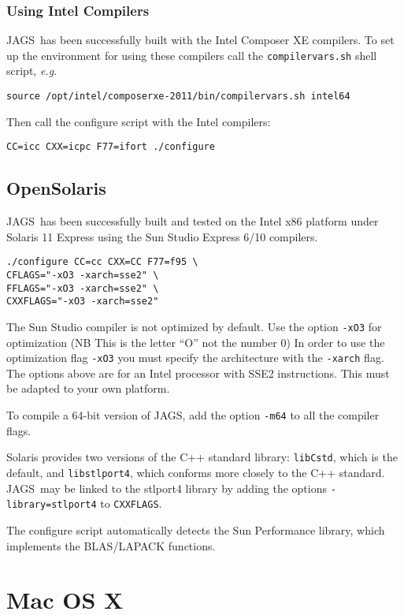 \documentclass[11pt, a4paper, titlepage]{article}
\newcommand{\JAGS}{\textsf{JAGS}}
\begin{document}
\subsubsection{Using Intel Compilers}

\JAGS\ has been successfully built with the Intel Composer XE
compilers. To set up the environment for using these compilers call
the \verb+compilervars.sh+ shell script, {\em e.g.}
\begin{verbatim}
source /opt/intel/composerxe-2011/bin/compilervars.sh intel64
\end{verbatim}
Then call the configure script with the Intel compilers:
\begin{verbatim}
CC=icc CXX=icpc F77=ifort ./configure 
\end{verbatim}

\subsection{OpenSolaris}

\JAGS\ has been successfully built and tested on the Intel x86
platform under Solaris 11 Express using the Sun Studio Express 6/10
compilers.
\begin{verbatim}
./configure CC=cc CXX=CC F77=f95 \
CFLAGS="-xO3 -xarch=sse2" \
FFLAGS="-xO3 -xarch=sse2" \
CXXFLAGS="-xO3 -xarch=sse2"
\end{verbatim}
The Sun Studio compiler is not optimized by default. Use the option
\verb+-xO3+ for optimization (NB This is the letter ``O'' not the
number 0) In order to use the optimization flag \verb+-xO3+ you
must specify the architecture with the \verb+-xarch+ flag. The options
above are for an Intel processor with SSE2 instructions. This must be
adapted to your own platform.

To compile a 64-bit version of JAGS, add the option \verb+-m64+ to
all the compiler flags.

Solaris provides two versions of the C++ standard library:
\texttt{libCstd}, which is the default, and \texttt{libstlport4},
which conforms more closely to the C++ standard. \JAGS\ may be linked
to the stlport4 library by adding the options
\verb+-library=stlport4+ to \verb+CXXFLAGS+. 

The configure script automatically detects the Sun Performance library,
which implements the BLAS/LAPACK functions.  

\clearpage
\section{Mac OS X}
\end{document}
